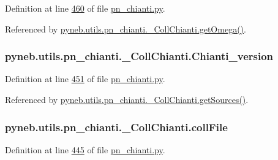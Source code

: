 Definition at line \hyperlink{pn__chianti_8py_source_l00460}{460} of file \hyperlink{pn__chianti_8py_source}{pn\-\_\-chianti.\-py}.



Referenced by \hyperlink{pn__chianti_8py_source_l00507}{pyneb.\-utils.\-pn\-\_\-chianti.\-\_\-\-Coll\-Chianti.\-get\-Omega()}.

\hypertarget{classpyneb_1_1utils_1_1pn__chianti_1_1___coll_chianti_af02b0dfb67aec7e96a92b42f2ba26699}{
\subsubsection[{Chianti\-\_\-version}]{\setlength{\rightskip}{0pt plus 5cm}pyneb.\-utils.\-pn\-\_\-chianti.\-\_\-\-Coll\-Chianti.\-Chianti\-\_\-version}}\label{classpyneb_1_1utils_1_1pn__chianti_1_1___coll_chianti_af02b0dfb67aec7e96a92b42f2ba26699}


Definition at line \hyperlink{pn__chianti_8py_source_l00451}{451} of file \hyperlink{pn__chianti_8py_source}{pn\-\_\-chianti.\-py}.



Referenced by \hyperlink{pn__chianti_8py_source_l00570}{pyneb.\-utils.\-pn\-\_\-chianti.\-\_\-\-Coll\-Chianti.\-get\-Sources()}.

\hypertarget{classpyneb_1_1utils_1_1pn__chianti_1_1___coll_chianti_aafcdb306ebd11d4b89fd80923a8d69c9}{
\subsubsection[{coll\-File}]{\setlength{\rightskip}{0pt plus 5cm}pyneb.\-utils.\-pn\-\_\-chianti.\-\_\-\-Coll\-Chianti.\-coll\-File}}\label{classpyneb_1_1utils_1_1pn__chianti_1_1___coll_chianti_aafcdb306ebd11d4b89fd80923a8d69c9}


Definition at line \hyperlink{pn__chianti_8py_source_l00445}{445} of file \hyperlink{pn__chianti_8py_source}{pn\-\_\-chianti.\-py}.

